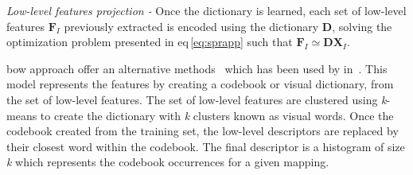 \emph{Low-level features projection -} Once the dictionary is learned, each set of low-level features $\mathbf{F}_{I}$ previously extracted is encoded using the dictionary $\mathbf{D}$, solving the optimization problem presented in \acs{eq}\,\eqref{eq:sprapp} such that $\mathbf{F}_{I} \simeq \mathbf{DX}_{I}$.

\ac{bow} approach offer an alternative methods~\cite{Sivic2003} which has been used by \citeauthor{rampun2016computerb} in~\cite{rampun2015classifying}.
This model represents the features by creating a codebook or visual dictionary, from the set of low-level features.
The set of low-level features are clustered using \textit{k}-means to create the dictionary with \textit{k} clusters known as visual words.
Once the codebook created from the training set, the low-level descriptors are replaced by their closest word within the codebook.
The final descriptor is a histogram of size \textit{k} which represents the codebook occurrences for a given mapping.


